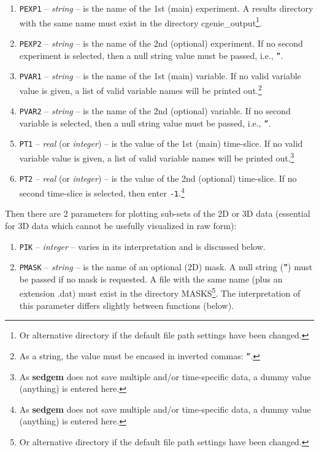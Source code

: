 \documentclass[11pt,fleqn]{book} %
\begin{document}
\begin{enumerate}
\item \texttt{PEXP1} -- \textit{string} -- is the name of the 1st (main) experiment. A results directory with the same name must exist in the directory \footnotesize\textsf{cgenie\_output}\normalsize\footnote{Or alternative directory if the default file path settings have been changed.}. 
\item \texttt{PEXP2} -- \textit{string} -- is the name of the 2nd (optional) experiment. If no second experiment is selected, then a null string value must be passed, i.e., \texttt{''}.
\item \texttt{PVAR1} -- \textit{string} -- is the name of the 1st (main) variable. If no valid variable value is given, a list of valid variable names will be printed out.\footnote{As a string, the value must be encased in inverted commas: \texttt{''}.}
\item \texttt{PVAR2} -- \textit{string} -- is the name of the 2nd (optional) variable. If no second variable is selected, then a null string value must be passed, i.e., \texttt{''}.
\item \texttt{PT1} -- \textit{real} (or \textit{integer}) -- is the value of the 1st (main) time-slice. If no valid variable value is given, a list of valid variable names will be printed out.\footnote{As \textbf{sedgem} does not save multiple and/or time-specific data, a dummy value (anything) is entered here.}
\item \texttt{PT2} -- \textit{real} (or \textit{integer}) -- is the value of the 2nd (optional) time-slice. If no second time-slice is selected, then enter \texttt{-1}.\footnote{As \textbf{sedgem} does not save multiple and/or time-specific data, a dummy value (anything) is entered here.}
\end{enumerate}
Then there are 2 parameters for plotting sub-sets of the 2D or 3D data (essential for 3D data which cannot be usefully visualized in raw form):
\begin{enumerate}
\item \texttt{PIK} -- \textit{integer} -- varies in its interpretation and is discussed below.
\item \texttt{PMASK} -- \textit{string} -- is the name of an optional (2D) mask. A null string (\texttt{''}) must be passed if no mask is requested. A file with the same name (plus an extension \footnotesize\textsf{.dat}\normalsize) must exist in the directory \footnotesize\textsf{MASKS}\normalsize\footnote{Or alternative directory if the default file path settings have been changed.}. The interpretation of this parameter differs slightly between functions (below).
\end{enumerate}
\end{document}
